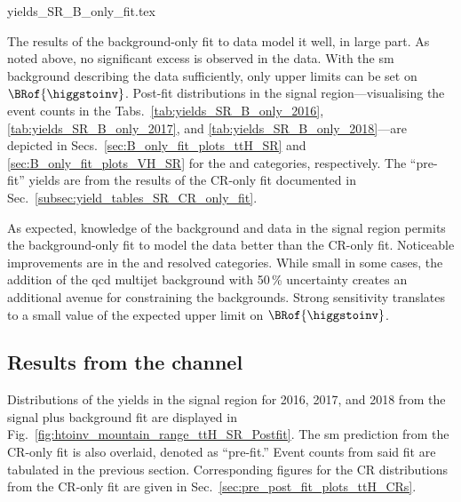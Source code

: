 \clearpage




{yields_SR_B_only_fit.tex}

\clearpage

The results of the background-only fit to data model it well, in large part. As noted above, no significant excess is observed in the data. With the \acrshort{sm} background describing the data sufficiently, only upper limits can be set on $\BRof{\higgstoinv}$. Post-fit distributions in the signal region---visualising the event counts in the Tabs.~\ref{tab:yields_SR_B_only_2016}, \ref{tab:yields_SR_B_only_2017}, and \ref{tab:yields_SR_B_only_2018}---are depicted in Secs.~\ref{sec:B_only_fit_plots_ttH_SR} and \ref{sec:B_only_fit_plots_VH_SR} for the \ttH and \VH categories, respectively. The ``pre-fit'' yields are from the results of the \gls{CR}-only fit documented in Sec.~\ref{subsec:yield_tables_SR_CR_only_fit}.

As expected, knowledge of the background and data in the signal region permits the background-only fit to model the data better than the \gls{CR}-only fit. Noticeable improvements are in the \ttH and \VH resolved categories. While small in some cases, the addition of the \acrshort{qcd} multijet background with 50\,\% uncertainty creates an additional avenue for constraining the backgrounds. Strong sensitivity translates to a small value of the expected upper limit on $\BRof{\higgstoinv}$.




\subsection{Results from the \texorpdfstring{\ttH}{ttH} channel}
\label{subsec:htoinv_results_ttH}

Distributions of the yields in the signal region for 2016, 2017, and 2018 from the signal plus background fit are displayed in Fig.~\ref{fig:htoinv_mountain_range_ttH_SR_Postfit}. The \acrshort{sm} prediction from the \gls{CR}-only fit is also overlaid, denoted as ``pre-fit.'' Event counts from said fit are tabulated in the previous section. Corresponding figures for the \gls{CR} distributions from the \gls{CR}-only fit are given in Sec.~\ref{sec:pre_post_fit_plots_ttH_CRs}.

